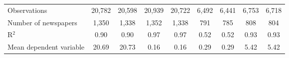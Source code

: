 {\begin{tabular}{l*{8}{c}}
\midrule
Observations        &      20,782         &      20,598         &      20,939         &      20,722         &       6,492         &       6,441         &       6,753         &       6,718         \\
Number of newspapers&       1,350         &       1,338         &       1,352         &       1,338         &         791         &         785         &         808         &         804         \\
R$^2$               &        0.90         &        0.90         &        0.97         &        0.97         &        0.52         &        0.52         &        0.93         &        0.93         \\
Mean dependent variable&       20.69         &       20.73         &        0.16         &        0.16         &        0.29         &        0.29         &        5.42         &        5.42         \\
\bottomrule
\end{tabular}
}
